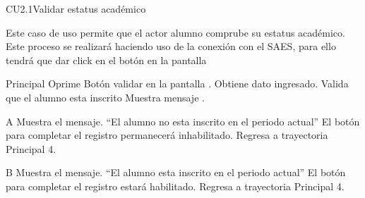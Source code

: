 \begin{UseCase}{CU2.1}{Validar estatus académico}{
		\noindent Este caso de uso permite que el actor alumno comprube su estatus académico. Este proceso se realizará haciendo uso de la conexión con el SAES, para ello tendrá que dar click en el botón  en la pantalla  
		
	}\label{CU3_Validacionestatusacademico}
\end{UseCase}
\begin{UCtrayectoria}{Principal}
	\UCpaso[\UCactor] Oprime Botón validar en la pantalla .
	\UCpaso Obtiene dato ingresado.
	\UCpaso Valida que el alumno esta inscrito 
	\UCpaso Muestra mensaje .  
\end{UCtrayectoria}

\begin{UCtrayectoriaA}{A}{}
	\UCpaso Muestra el mensaje. “El alumno no esta inscrito en el periodo actual”
	\UCpaso El botón para completar el registro permanecerá inhabilitado.
	\UCpaso Regresa a trayectoria Principal 4.
\end{UCtrayectoriaA}

\begin{UCtrayectoriaA}{B}{}
	\UCpaso Muestra el mensaje. “El alumno esta inscrito en el periodo actual”
	\UCpaso El botón para completar el registro estará habilitado.
	\UCpaso Regresa a trayectoria Principal 4.
\end{UCtrayectoriaA}